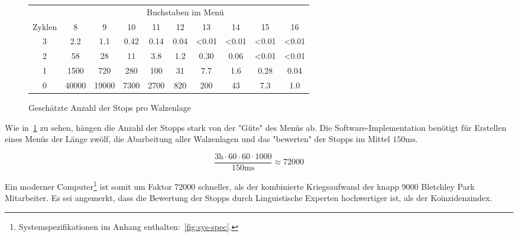 \newpage
\begin{figure}[htbp]
	\centering
	\caption{Geschätzte Anzahl der Stops pro Walzenlage~\autocite{enwiki:bombe}}
	\label{fig:num-stops}
	\begin{tabular}{|c||c|c|c|c|c|c|c|c|c|}
		\hline
		& \multicolumn{9}{c|}{Buchstaben im Menü} \\
		Zyklen & 8 & 9 & 10 & 11 & 12 & 13 & 14 & 15 & 16 \\
		\hhline{|=||=|=|=|=|=|=|=|=|=|}
		3 & 2.2  & 1.1  & 0.42  & 0.14  & 0.04  & <0.01  & <0.01  & <0.01  & <0.01 \\
		\hline
		2 & 58  & 28  & 11  & 3.8  & 1.2  & 0.30  & 0.06  & <0.01  & <0.01  \\
		\hline
		1 & 1500  & 720  & 280  & 100  & 31  & 7.7  & 1.6  & 0.28  & 0.04  \\
		\hline
		0 & 40000  & 19000  & 7300  & 2700  & 820  & 200  & 43  & 7.3  & 1.0  \\
		\hline
	\end{tabular}
\end{figure}


Wie in~\cref{fig:num-stops} zu sehen, hängen die Anzahl der Stopps stark von der "Güte" des Menüs ab.
Die Software-Implementation benötigt für Erstellen eines Menüs der Länge zwölf, die Abarbeitung aller Walzenlagen und das "bewerten" der Stopps im Mittel
$150\si{\ms}$.

\[
\frac{3\si{\hour} \cdot 60 \cdot 60 \cdot 1000}{150\si{\ms}} \approx 72000
\]

Ein moderner Computer\footnote{Systemspezifikationen im Anhang enthalten:~\cref{fig:sys-spec}.} ist somit um Faktor 72000 schneller, als der kombinierte Kriegsaufwand der knapp 9000 Bletchley Park Mitarbeiter.
Es sei angemerkt, dass die Bewertung der Stopps durch Linguistische Experten hochwertiger ist, als der Koinzidenzindex.
